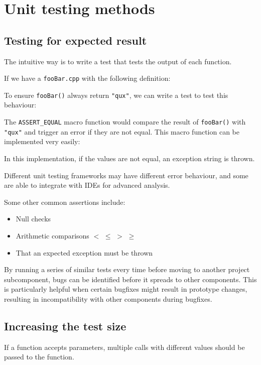 \section{Unit testing methods}
\subsection{Testing for expected result}
The intuitive way is to write a test that tests the output of each function.

If we have a \texttt{fooBar.cpp} with the following definition:


To ensure \texttt{fooBar()} always return \texttt{"qux"}, we can write a test to test this behaviour:


The \texttt{ASSERT\_EQUAL} macro function would compare the result of \texttt{fooBar()} with \texttt{"qux"} and trigger an error if they are not equal.
This macro function can be implemented very easily:


In this implementation, if the values are not equal, an exception string is thrown.

Different unit testing frameworks may have different error behaviour, and some are able to integrate with IDEs for advanced analysis.

Some other common assertions include:
\begin{itemize}
	\item Null checks
	\item Arithmetic comparisons $<$ $\leq$ $>$ $\geq$
	\item That an expected exception must be thrown
\end{itemize}

By running a series of similar tests every time before moving to another project subcomponent,
bugs can be identified before it spreads to other components.
This is particularly helpful when certain bugfixes might result in prototype changes,
resulting in incompatibility with other components during bugfixes.

\subsection{Increasing the test size}
If a function accepts parameters, multiple calls with different values should be passed to the function.

